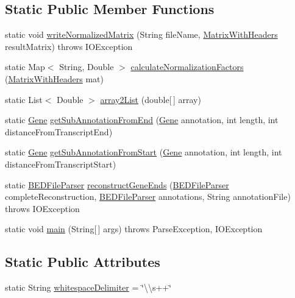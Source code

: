 \subsection*{Static Public Member Functions}
\begin{DoxyCompactItemize}
\item 
static void \hyperlink{classumms_1_1esat_1_1_e_s_a_t_a0c0805cb33f787baa8c74f6b382bfaa7}{write\+Normalized\+Matrix} (String file\+Name, \hyperlink{classbroad_1_1core_1_1datastructures_1_1_matrix_with_headers}{Matrix\+With\+Headers} result\+Matrix)  throws I\+O\+Exception
\item 
static Map$<$ String, Double $>$ \hyperlink{classumms_1_1esat_1_1_e_s_a_t_a36fc452b596f2408460fc28d50f98d4f}{calculate\+Normalization\+Factors} (\hyperlink{classbroad_1_1core_1_1datastructures_1_1_matrix_with_headers}{Matrix\+With\+Headers} mat)
\item 
static List$<$ Double $>$ \hyperlink{classumms_1_1esat_1_1_e_s_a_t_aa50134cfa33375dd6440974c7915cd9c}{array2\+List} (double\mbox{[}$\,$\mbox{]} array)
\item 
static \hyperlink{classumms_1_1core_1_1annotation_1_1_gene}{Gene} \hyperlink{classumms_1_1esat_1_1_e_s_a_t_aeb4346e593752ad30a10e4c59026e85d}{get\+Sub\+Annotation\+From\+End} (\hyperlink{classumms_1_1core_1_1annotation_1_1_gene}{Gene} annotation, int length, int distance\+From\+Transcript\+End)
\item 
static \hyperlink{classumms_1_1core_1_1annotation_1_1_gene}{Gene} \hyperlink{classumms_1_1esat_1_1_e_s_a_t_a46150c22de56265a4175d196b4f50ae2}{get\+Sub\+Annotation\+From\+Start} (\hyperlink{classumms_1_1core_1_1annotation_1_1_gene}{Gene} annotation, int length, int distance\+From\+Transcript\+Start)
\item 
static \hyperlink{classbroad_1_1pda_1_1annotation_1_1_b_e_d_file_parser}{B\+E\+D\+File\+Parser} \hyperlink{classumms_1_1esat_1_1_e_s_a_t_aa9024ccb95db2d1a32965900440c3fd5}{reconstruct\+Gene\+Ends} (\hyperlink{classbroad_1_1pda_1_1annotation_1_1_b_e_d_file_parser}{B\+E\+D\+File\+Parser} complete\+Reconstruction, \hyperlink{classbroad_1_1pda_1_1annotation_1_1_b_e_d_file_parser}{B\+E\+D\+File\+Parser} annotations, String annotation\+File)  throws I\+O\+Exception
\item 
static void \hyperlink{classumms_1_1esat_1_1_e_s_a_t_af92b8b50582e8db464efe59683a5b709}{main} (String\mbox{[}$\,$\mbox{]} args)  throws Parse\+Exception, I\+O\+Exception 
\end{DoxyCompactItemize}
\subsection*{Static Public Attributes}
\begin{DoxyCompactItemize}
\item 
static String \hyperlink{classumms_1_1esat_1_1_e_s_a_t_a93155d1747d9b0ed664ff516e3082eda}{whitespace\+Delimiter} = \char`\"{}\textbackslash{}\textbackslash{}s++\char`\"{}
\end{DoxyCompactItemize}


